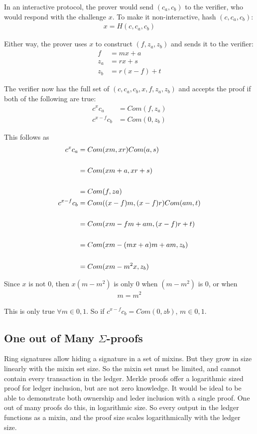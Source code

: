 \documentclass{article}
\begin{document}
In an interactive protocol, the prover would send $(c_a,c_b)$ to the verifier, who would respond with the challenge $x$.  To make it non-interactive, hash $(c, c_a, c_b)$:
\begin{align}
  x = H(c, c_a, c_b)
\end{align}

Either way, the prover uses $x$ to construct $(f, z_a, z_b)$ and sends it to the verifier:
\begin{align}
  f &= mx + a\\
  z_a &= rx + s\\
  z_b &= r(x-f) + t
\end{align}

The verifier now has the full set of $(c, c_a, c_b, x, f, z_a, z_b)$ and accepts the proof if both of the following are true:
\begin{align}
  c^x c_a &= Com(f, z_a)\\
  c^{x-f} c_b &= Com(0, z_b)
\end{align}

This follows as 
\begin{align}
  c^x c_a &= Com(xm,xr) Com(a,s)\\
  \cr &= Com(xm+a, xr+s)\\
  \cr &= Com(f, za)\\
  c^{x-f} c_b &= Com((x-f)m, (x-f)r) Com(am, t)\\
  \cr &= Com(xm - fm + am, (x-f)r + t)\\
  \cr &= Com(xm - (mx + a)m + am, z_b)\\
  \cr &= Com(xm - m^2 x, z_b)
\end{align}

Since $x$ is not $0$, then $x (m-m^2)$ is only $0$ when $(m-m^2)$ is $0$, or when
\begin{align}
  m = m^2
\end{align}

This is only true $\forall m \in {0,1}$.  So if $c^{x-f} c_b = Com(0,zb)$, $m \in {0,1}$.


\subsection{One out of Many $\Sigma$-proofs}

Ring signatures allow hiding a signature in a set of mixins.  But they grow in size linearly with the mixin set size.  So the mixin set must be limited, and cannot contain every transaction in the ledger.  Merkle proofs offer a logarithmic sized proof for ledger inclusion, but are not zero knowledge.  It would be ideal to be able to demonstrate both ownership and leder inclusion with a single proof.  One out of many proofs do this, in logarithmic size.  So every output in the ledger functions as a mixin, and the proof size scales logarithmically with the ledger size.
\end{document}
